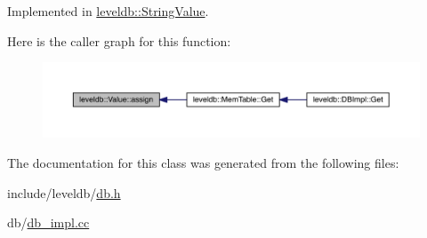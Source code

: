 Implemented in \hyperlink{classleveldb_1_1_string_value_aa9c352a76c68f3256480dd4f2dedbb37}{leveldb\+::\+String\+Value}.



Here is the caller graph for this function\+:\nopagebreak
\begin{figure}[H]
\begin{center}
\leavevmode
\includegraphics[width=350pt]{classleveldb_1_1_value_ac992abccdbb453f5c0ca233e56f9aa9f_icgraph}
\end{center}
\end{figure}




The documentation for this class was generated from the following files\+:\begin{DoxyCompactItemize}
\item 
include/leveldb/\hyperlink{db_8h}{db.\+h}\item 
db/\hyperlink{db__impl_8cc}{db\+\_\+impl.\+cc}\end{DoxyCompactItemize}
